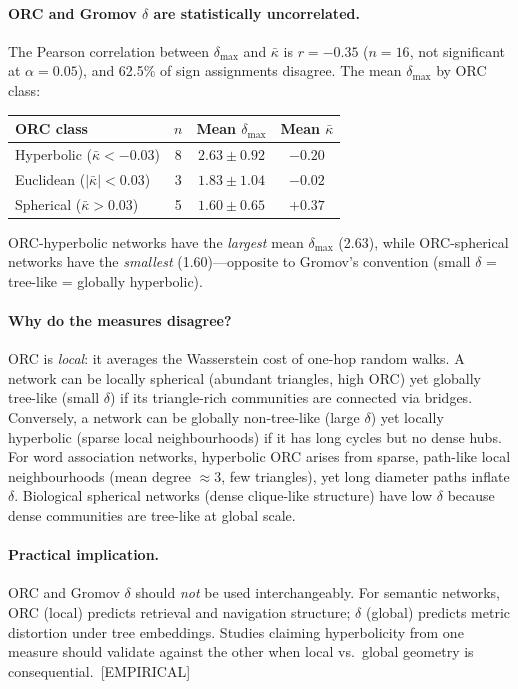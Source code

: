 \documentclass[11pt,a4paper]{article}
\newcommand{\kbar}{\bar{\kappa}}
\begin{document}
\paragraph{ORC and Gromov $\delta$ are statistically uncorrelated.}
The Pearson correlation between $\delta_{\max}$ and $\kbar$ is $r = -0.35$ ($n=16$, not significant at $\alpha=0.05$), and 62.5\% of sign assignments disagree. The mean $\delta_{\max}$ by ORC class:
\begin{center}
\small
\begin{tabular}{@{}lccc@{}}
\toprule
ORC class & $n$ & Mean $\delta_{\max}$ & Mean $\kbar$ \\
\midrule
Hyperbolic ($\kbar < -0.03$) & 8 & $2.63 \pm 0.92$ & $-0.20$ \\
Euclidean ($|\kbar| < 0.03$)  & 3 & $1.83 \pm 1.04$ & $-0.02$ \\
Spherical ($\kbar > 0.03$)    & 5 & $1.60 \pm 0.65$ & $+0.37$ \\
\bottomrule
\end{tabular}
\end{center}
ORC-hyperbolic networks have the \emph{largest} mean $\delta_{\max}$ (2.63), while ORC-spherical networks have the \emph{smallest} (1.60)---opposite to Gromov's convention (small $\delta$ = tree-like = globally hyperbolic).

\paragraph{Why do the measures disagree?}
ORC is \emph{local}: it averages the Wasserstein cost of one-hop random walks. A network can be locally spherical (abundant triangles, high ORC) yet globally tree-like (small $\delta$) if its triangle-rich communities are connected via bridges. Conversely, a network can be globally non-tree-like (large $\delta$) yet locally hyperbolic (sparse local neighbourhoods) if it has long cycles but no dense hubs. For word association networks, hyperbolic ORC arises from sparse, path-like local neighbourhoods (mean degree $\approx 3$, few triangles), yet long diameter paths inflate $\delta$. Biological spherical networks (dense clique-like structure) have low $\delta$ because dense communities are tree-like at global scale.

\paragraph{Practical implication.}
ORC and Gromov $\delta$ should \emph{not} be used interchangeably. For semantic networks, ORC (local) predicts retrieval and navigation structure; $\delta$ (global) predicts metric distortion under tree embeddings. Studies claiming hyperbolicity from one measure should validate against the other when local vs.\ global geometry is consequential.~[EMPIRICAL]
\end{document}
